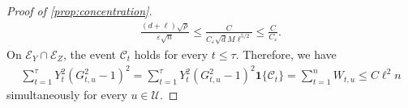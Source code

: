 \documentclass[11pt]{article}
\newcommand{\1}{\mathbf 1}
\newcommand{\eps}{\varepsilon}
\begin{document}
\begin{proof}[Proof of \cref{prop:concentration}]
    \begin{align}
        \frac{(d+\ell)\sqrt\rho}{\eps\sqrt n}
        \leq
        \frac{C}{C_\eps\sqrt dM\ell^{5/2}}
        \leq\frac{C}{C_\eps}.
        \label{eq:H-score-energy-absorption}
    \end{align}
    On $\mathcal E_Y\cap\mathcal E_Z$, the event $\mathcal C_t$ holds
    for every $t\leq\tau$.
    Therefore, we have
    \begin{align}
        \sum_{t=1}^{\tau}
        Y_t^2(G_{t,u}^2-1)^2
        =
        \sum_{t=1}^{\tau}
        Y_t^2(G_{t,u}^2-1)^2
        \1\{\mathcal C_t\}
        =
        \sum_{t=1}^n
        W_{t,u}
        \leq C\ell^2n
        \label{eq:H-realised-score-energy}
    \end{align}
    simultaneously for every $u\in\mathcal U$.


\end{proof}
\end{document}

